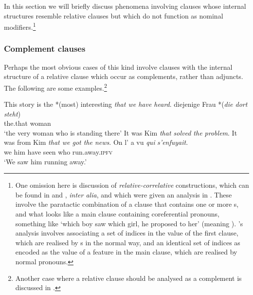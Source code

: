 \documentclass[output=paper
 	        ,biblatex
                ,babelshorthands
                ,newtxmath
                ,draftmode
                ,colorlinks, citecolor=brown
]{langscibook}
\begin{document}
In this section we will briefly discuss phenomena involving clauses whose internal
structures resemble relative clauses but which do not function as nominal
modifiers.\footnote{One omission here is discussion of \emph{relative-correlative} constructions,
  which can be found in  and , \emph{inter alia}, and which were given an
  analysis in . These involve the paratactic combination of
  a clause that contains one or more s, and what looks like a main clause
  containing coreferential pronouns, something like `which boy saw which girl, he proposed
  to her' (meaning ). \citeauthor{Pollard:Sag:94}'s analysis involves associating a set of
  indices in the  value of the first clause, which are realised by s in the
  normal way, and an identical set of indices as encoded as the value of a
   feature in the main clause, which
  are realised by normal pronouns.}

\subsubsection{Complement clauses}
\label{sec:rc-complement-clauses}

Perhaps the most obvious cases of this kind involve clauses with the internal structure of
a relative clause which occur as complements, rather than adjuncts. The following are some
examples.\footnote{Another case where a relative clause should be analysed as a complement
  is discussed in .
}
\begin{exe}\ex\begin{xlist}
\ex\label{x:rc-128} This story is the *(most) interesting \emph{that we have heard}.
\ex\label{x:rc-129}
\gll diejenige Frau *(\emph{die dort steht})\\ 
    the.that woman \hphantom{*(}{who there stands}\\
    \glt `the very woman who is standing there'
\ex\label{x:rc-130} It was Kim \emph{that solved the problem}.
\ex\label{x:rc-131} It was from Kim \emph{that we got the news}. 
\ex\label{x:rc-132} 
\gll On l' a  vu \emph{qui} \emph{s'enfuyait}.\\
     we him have seen who run.away.\textsc{ipfv}\\
\glt `We saw him running away.'
\end{xlist}\end{exe}
\end{document}
